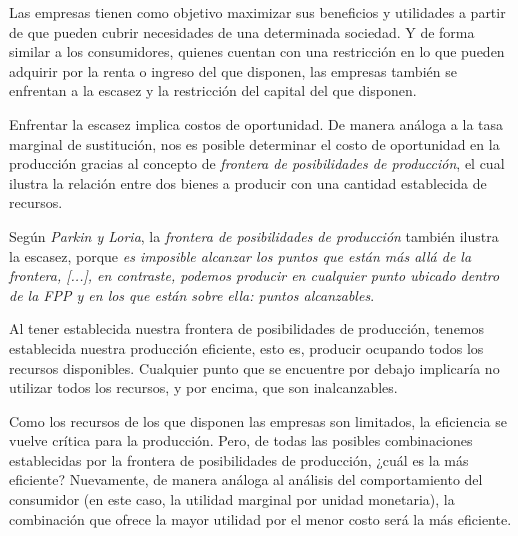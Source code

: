 \documentclass[a4paper,12pt]{report}
\begin{document}
Las empresas tienen como objetivo maximizar sus beneficios y utilidades a partir de que pueden cubrir necesidades de una determinada sociedad. Y de forma similar a los consumidores, quienes cuentan con una restricción en lo que pueden adquirir por la renta o ingreso del que disponen, las empresas también se enfrentan a la escasez y la restricción del capital del que disponen.\\

\vspace{0.5cm}

Enfrentar la escasez implica costos de oportunidad. De manera análoga a la tasa marginal de sustitución, nos es posible determinar el costo de oportunidad en la producción gracias al concepto de \emph{frontera de posibilidades de producción}, el cual ilustra la relación entre dos bienes a producir con una cantidad establecida de recursos. \\

\vspace{0.5cm}

Según \emph{Parkin y Loria}, la \emph{frontera de posibilidades de producción} también ilustra la escasez, porque \textit{ es imposible alcanzar los puntos que están más allá de la frontera, [...], en contraste, podemos producir en
cualquier punto ubicado dentro de la FPP y en los
que están sobre ella: puntos alcanzables}.\\

\vspace{0.5cm}

Al tener establecida nuestra frontera de posibilidades de producción, tenemos establecida nuestra producción eficiente, esto es, producir ocupando todos los recursos disponibles. Cualquier punto que se encuentre por debajo implicaría no utilizar todos los recursos, y por encima, que son inalcanzables.\\

\vspace{0.5cm}

Como los recursos de los que disponen las empresas son limitados, la eficiencia se vuelve crítica para la producción. Pero, de todas las posibles combinaciones establecidas por la frontera de posibilidades de producción, ¿cuál es la más eficiente? Nuevamente, de manera análoga al análisis del comportamiento del consumidor (en este caso, la utilidad marginal por unidad monetaria), la combinación que ofrece la mayor utilidad por el menor costo será la más eficiente.\\
\end{document}
